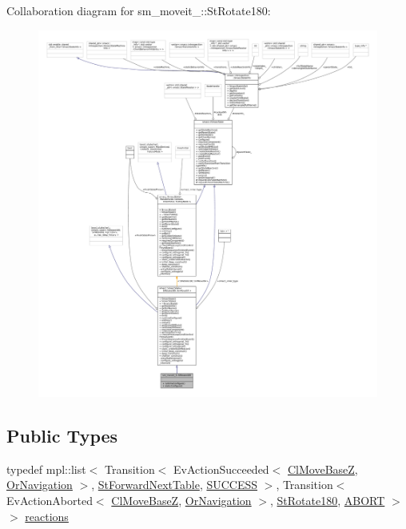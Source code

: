 Collaboration diagram for sm\+\_\+moveit\+\_\+:\+:St\+Rotate180\+:
\nopagebreak
\begin{figure}[H]
\begin{center}
\leavevmode
\includegraphics[width=350pt]{structsm__moveit__4_1_1StRotate180__coll__graph}
\end{center}
\end{figure}
\subsection*{Public Types}
\begin{DoxyCompactItemize}
\item 
typedef mpl\+::list$<$ Transition$<$ Ev\+Action\+Succeeded$<$ \hyperlink{classcl__move__base__z_1_1ClMoveBaseZ}{Cl\+Move\+BaseZ}, \hyperlink{classsm__moveit__4_1_1OrNavigation}{Or\+Navigation} $>$, \hyperlink{structsm__moveit__4_1_1StForwardNextTable}{St\+Forward\+Next\+Table}, \hyperlink{classSUCCESS}{S\+U\+C\+C\+E\+SS} $>$, Transition$<$ Ev\+Action\+Aborted$<$ \hyperlink{classcl__move__base__z_1_1ClMoveBaseZ}{Cl\+Move\+BaseZ}, \hyperlink{classsm__moveit__4_1_1OrNavigation}{Or\+Navigation} $>$, \hyperlink{structsm__moveit__4_1_1StRotate180}{St\+Rotate180}, \hyperlink{classABORT}{A\+B\+O\+RT} $>$ $>$ \hyperlink{structsm__moveit__4_1_1StRotate180_a7e808c96dc3c1c7aa16e2fa1dd5820fb}{reactions}
\end{DoxyCompactItemize}
